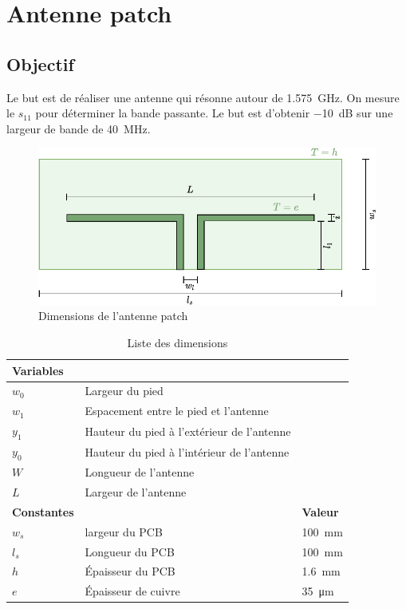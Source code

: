 \documentclass[Deriaz_Traiber_Labo02.tex]{subfiles}
\begin{document}
\chapter{Antenne patch}
\section{Objectif}
Le but est de réaliser une antenne qui résonne autour de \SI{1.575}{\giga\hertz}. On mesure le $s_{11}$ pour déterminer la bande passante. Le but est d'obtenir \SI{-10}{\deci\bel} sur une largeur de bande de \SI{40}{\mega\hertz}.

\begin{figure}[H]
\centering
\includegraphics[scale=1,page=2]{../Schemas-crop.pdf}
\caption{Dimensions de l'antenne patch}
\end{figure}
\begin{table}[H]
\centering
\begin{tabular}{lll}
\textbf{Variables}\\\hline
$w_0$ & Largeur du pied\\
$w_1$ & Espacement entre le pied et l'antenne\\
$y_1$ & Hauteur du pied à l'extérieur de l'antenne\\
$y_0$ & Hauteur du pied à l'intérieur de l'antenne\\
$W$ & Longueur de l'antenne\\
$L$ & Largeur de l'antenne\\
\textbf{Constantes} & & \textbf{Valeur}\\\hline
$w_s$ & largeur du PCB & \SI{100}{\milli\meter}\\
$l_s$ & Longueur du PCB & \SI{100}{\milli\meter}\\
$h$ & Épaisseur du PCB & \SI{1.6}{\milli\meter}\\
$e$ & Épaisseur de cuivre & \SI{35}{\micro\meter}
\end{tabular}
\caption{Liste des dimensions}
\end{table}
\end{document}
